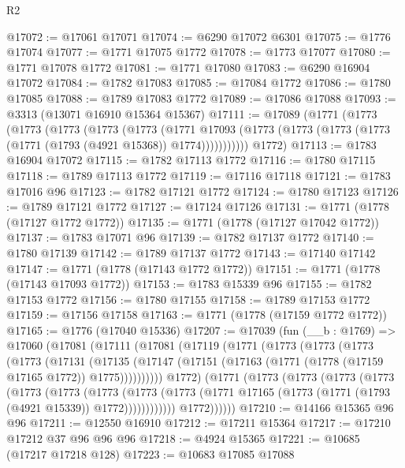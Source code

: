 \begin{lexlean}{R2}
\begin{coremodule}
@17072 := @17061 @17071
@17074 := @6290 @17072 @6301
@17075 := @1776 @17074
@17077 := @1771 @17075 @1772
@17078 := @1773 @17077
@17080 := @1771 @17078 @1772
@17081 := @1771 @17080
@17083 := @6290 @16904 @17072
@17084 := @1782 @17083
@17085 := @17084 @1772
@17086 := @1780 @17085
@17088 := @1789 @17083 @1772
@17089 := @17086 @17088
@17093 := @3313 (@13071 @16910 @15364 @15367)
@17111 := @17089
    (@1771
      (@1773
        (@1773
          (@1773
            (@1773
              (@1773
                (@1771
                  @17093
                  (@1773 (@1773 (@1773 (@1773 (@1771 (@1793 (@4921 @15368)) @1774)))))))))))
      @1772)
@17113 := @1783 @16904 @17072
@17115 := @1782 @17113 @1772
@17116 := @1780 @17115
@17118 := @1789 @17113 @1772
@17119 := @17116 @17118
@17121 := @1783 @17016 @96
@17123 := @1782 @17121 @1772
@17124 := @1780 @17123
@17126 := @1789 @17121 @1772
@17127 := @17124 @17126
@17131 := @1771 (@1778 (@17127 @1772 @1772))
@17135 := @1771 (@1778 (@17127 @17042 @1772))
@17137 := @1783 @17071 @96
@17139 := @1782 @17137 @1772
@17140 := @1780 @17139
@17142 := @1789 @17137 @1772
@17143 := @17140 @17142
@17147 := @1771 (@1778 (@17143 @1772 @1772))
@17151 := @1771 (@1778 (@17143 @17093 @1772))
@17153 := @1783 @15339 @96
@17155 := @1782 @17153 @1772
@17156 := @1780 @17155
@17158 := @1789 @17153 @1772
@17159 := @17156 @17158
@17163 := @1771 (@1778 (@17159 @1772 @1772))
@17165 := @1776 (@17040 @15336)
@17207 := @17039
    (fun (__b : @1769) =>
    @17060
      (@17081
        (@17111
          (@17081
            (@17119
              (@1771
                (@1773
                  (@1773
                    (@1773
                      (@1773
                        (@17131
                          (@17135
                            (@17147
                              (@17151 (@17163 (@1771 (@1778 (@17159 @17165 @1772)) @1775))))))))))
                @1772)
              (@1771
                (@1773
                  (@1773
                    (@1773
                      (@1773
                        (@1773
                          (@1773
                            (@1773
                              (@1773
                                (@1773
                                  (@1771
                                    @17165
                                    (@1773 (@1771 (@1793 (@4921 @15339)) @1772))))))))))))
                @1772))))))
@17210 := @14166 @15365 @96 @96
@17211 := @12550 @16910
@17212 := @17211 @15364
@17217 := @17210 @17212 @37 @96 @96 @96
@17218 := @4924 @15365
@17221 := @10685 (@17217 @17218 @128)
@17223 := @10683 @17085 @17088

\end{coremodule}
\end{lexlean}
